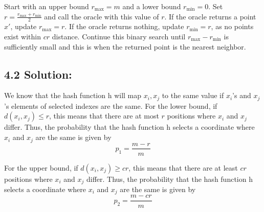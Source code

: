 \documentclass{article}
\begin{document}
Start with an upper bound \( r_{\text{max}} = m \) and a lower bound \( r_{\text{min}} = 0 \).
Set \( r = \frac{r_{\text{max}} + r_{\text{min}}}{2} \) and call the oracle with this value of \( r \).
If the oracle returns a point \( x' \), update \( r_{\text{max}} = r \). If the oracle returns nothing, update \( r_{\text{min}} = r \), as no points exist within \( cr \) distance. Continue this binary search until \( r_{\text{max}} - r_{\text{min}} \) is sufficiently small and this is when the returned point is the nearest neighbor.

\subsection*{4.2 Solution:}
We know that the hash function h will map $x_i, x_j$ to the same value if $x_i$'s and $x_j$'s elements of selected indexes are the same.
For the lower bound, if \( d(x_i, x_j) \leq r \), this means that there are at most $r$ positions where \(x_i\) and \(x_j\) differ.
Thus, the probability that the hash function h selects a coordinate where \( x_i \) and \( x_j \) are the same is given by
\[ p_1 = \frac{m - r}{m} \]

For the upper bound, if \( d(x_i, x_j) \geq c r \), this means that there are at least $cr$ positions where \(x_i\) and \(x_j\) differ.
Thus, the probability that the hash function h selects a coordinate where \( x_i \) and \( x_j \) are the same is given by
\[ p_2 = \frac{m - c r}{m} \]
\end{document}
